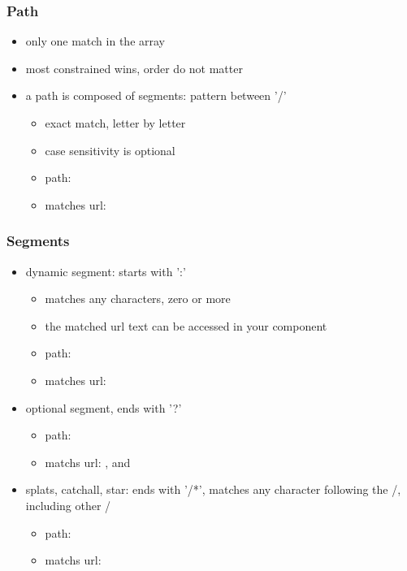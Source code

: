\begin{frame}[fragile] \frametitle{Path}
\begin{itemize}
  \item only one match in the array
  \item most constrained wins, order do not matter
  \item a path is composed of segments: pattern between '/'
  \begin{itemize}
    \item exact match, letter by letter
    \item case sensitivity is optional
    \item path: 
    \item matches url: 
  \end{itemize}
\end{itemize}
\end{frame}

\begin{frame}[fragile] \frametitle{Segments}
\begin{itemize}
  \item dynamic segment: starts with ':'
  \begin{itemize}
    \item matches any characters, zero or more
    \item the matched url text can be accessed in your component
    \item path: 
    \item matches url: 
  \end{itemize}
  \item optional segment, ends with '?'
  \begin{itemize}
    \item path: 
    \item matchs url: , and 
  \end{itemize}
  \item splats, catchall, star: ends with '/*', matches any character following the /, including other /
  \begin{itemize}
    \item path: 
    \item matchs url: 
  \end{itemize}
\end{itemize}
\end{frame}

